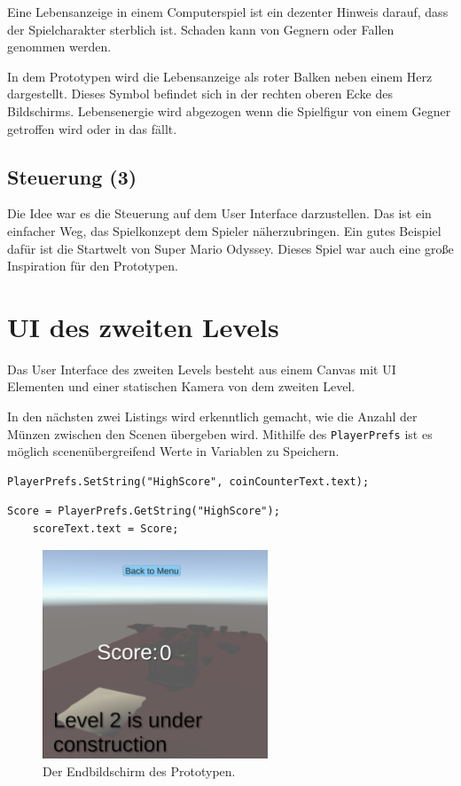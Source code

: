 Eine Lebensanzeige in einem Computerspiel ist ein dezenter Hinweis darauf, dass der Spielcharakter sterblich ist. Schaden kann von Gegnern oder Fallen genommen werden.

In dem Prototypen wird die Lebensanzeige als roter Balken neben einem Herz dargestellt. Dieses Symbol befindet sich in der rechten oberen Ecke des Bildschirms. Lebensenergie wird abgezogen wenn die Spielfigur von einem Gegner getroffen wird oder in das  fällt.

\subsection{Steuerung (3)}
Die Idee war es die Steuerung auf dem User Interface darzustellen. Das ist ein einfacher Weg, das Spielkonzept dem Spieler näherzubringen. Ein gutes Beispiel dafür ist die Startwelt von Super Mario Odyssey. Dieses Spiel war auch eine große Inspiration für den Prototypen. 

\section{UI des zweiten Levels}
Das User Interface des zweiten Levels besteht aus einem Canvas mit UI Elementen und einer statischen Kamera von dem zweiten Level. 

In den nächsten zwei Listings wird erkenntlich gemacht, wie die Anzahl der Münzen zwischen den Scenen übergeben wird. Mithilfe des \verb+PlayerPrefs+ ist es möglich scenenübergreifend Werte in Variablen zu Speichern. 
\begin{lstlisting}[language=CSharp,caption={Portal Klasse.},label=code:portal]
    PlayerPrefs.SetString("HighScore", coinCounterText.text);
\end{lstlisting}

\begin{lstlisting}[language=CSharp,caption={GameManager Klasse.},label=code:gamemanager]
    Score = PlayerPrefs.GetString("HighScore");
    scoreText.text = Score;
\end{lstlisting}


\begin{figure}[h]
    \centering
    \includegraphics[width=0.6\textwidth]{chapters/04/images/V3/Level2Game.png}
    \caption{Der Endbildschirm des Prototypen.}
    \label{fig:UI20}
\end{figure}